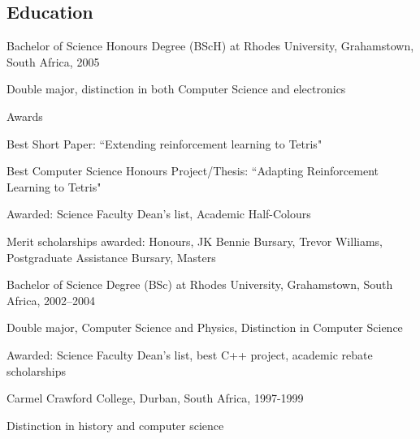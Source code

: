 \documentclass{article}
\begin{document}
\subsection*{Education}
\begin{itemize}
\item{ Bachelor of Science Honours Degree (BScH) at Rhodes University, Grahamstown, South Africa, 2005}
	\end{itemize*}
\item{	Bachelor of Science Degree (BSc) at Rhodes University, Grahamstown, South Africa, 2002--2004}
	\begin{itemize*}
	\item{ Double major, Computer Science and Physics, Distinction in Computer Science}
        \item{ Awarded: Science Faculty Dean's list, best C++ project, academic rebate scholarships}
	\end{itemize*}
\item{	Carmel Crawford College, Durban, South Africa, 1997-1999}
	\begin{itemize*}
	\item{	Distinction in history and computer science}
	\end{itemize*}
\end{itemize}
\end{document}
